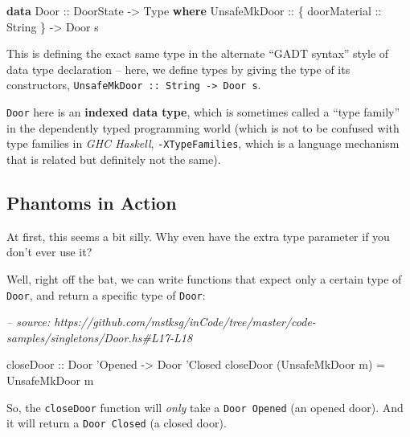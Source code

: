 \documentclass[]{article}
\newenvironment{Shaded}{}{}
\newcommand{\CommentTok}[1]{\textcolor[rgb]{0.38,0.63,0.69}{\textit{#1}}}
\newcommand{\DataTypeTok}[1]{\textcolor[rgb]{0.56,0.13,0.00}{#1}}
\newcommand{\FunctionTok}[1]{\textcolor[rgb]{0.02,0.16,0.49}{#1}}
\newcommand{\KeywordTok}[1]{\textcolor[rgb]{0.00,0.44,0.13}{\textbf{#1}}}
\newcommand{\NormalTok}[1]{#1}
\newcommand{\OtherTok}[1]{\textcolor[rgb]{0.00,0.44,0.13}{#1}}
\begin{document}
\begin{Shaded}
\begin{Highlighting}[]
\KeywordTok{data} \DataTypeTok{Door}\OtherTok{ ::} \DataTypeTok{DoorState} \OtherTok{->} \DataTypeTok{Type} \KeywordTok{where}
    \DataTypeTok{UnsafeMkDoor}\OtherTok{ ::}\NormalTok{ \{}\OtherTok{ doorMaterial ::} \DataTypeTok{String}\NormalTok{ \} }\OtherTok{->} \DataTypeTok{Door}\NormalTok{ s}
\end{Highlighting}
\end{Shaded}

This is defining the exact same type in the alternate ``GADT syntax'' style of
data type declaration -- here, we define types by giving the type of its
constructors, \texttt{UnsafeMkDoor\ ::\ String\ -\textgreater{}\ Door\ s}.

\texttt{Door} here is an \textbf{indexed data type}, which is sometimes called a
``type family'' in the dependently typed programming world (which is not to be
confused with type families in \emph{GHC Haskell}, \texttt{-XTypeFamilies},
which is a language mechanism that is related but definitely not the same).

\hypertarget{phantoms-in-action}{%
\subsection{Phantoms in Action}\label{phantoms-in-action}}

At first, this seems a bit silly. Why even have the extra type parameter if you
don't ever use it?

Well, right off the bat, we can write functions that expect only a certain type
of \texttt{Door}, and return a specific type of \texttt{Door}:

\begin{Shaded}
\begin{Highlighting}[]
\CommentTok{-- source: https://github.com/mstksg/inCode/tree/master/code-samples/singletons/Door.hs#L17-L18}

\OtherTok{closeDoor ::} \DataTypeTok{Door}\NormalTok{ '}\DataTypeTok{Opened} \OtherTok{->} \DataTypeTok{Door}\NormalTok{ '}\DataTypeTok{Closed}
\NormalTok{closeDoor (}\DataTypeTok{UnsafeMkDoor}\NormalTok{ m) }\FunctionTok{=} \DataTypeTok{UnsafeMkDoor}\NormalTok{ m}
\end{Highlighting}
\end{Shaded}

So, the \texttt{closeDoor} function will \emph{only} take a
\texttt{Door\ \textquotesingle{}Opened} (an opened door). And it will return a
\texttt{Door\ \textquotesingle{}Closed} (a closed door).
\end{document}
